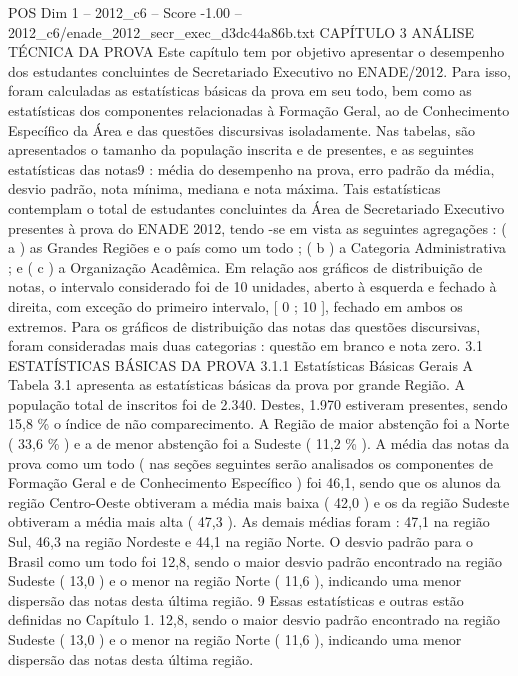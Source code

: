 \begin{textsample}{POS Dim 1 – 2012\_c6 – Score -1.00 – 2012\_c6/enade\_2012\_secr\_exec\_d3dc44a86b.txt}  \label{ex:f1_pos_186}
CAPÍTULO 3 ANÁLISE TÉCNICA DA PROVA Este capítulo tem por objetivo apresentar o desempenho dos estudantes concluintes de Secretariado Executivo no ENADE/2012.
Para isso, foram calculadas as estatísticas básicas da prova em seu todo, bem como as estatísticas dos componentes relacionadas à Formação Geral, ao de Conhecimento Específico da Área e das questões discursivas isoladamente.
Nas tabelas, são apresentados o tamanho da população inscrita e de presentes, e as seguintes estatísticas das notas9 : média do desempenho na prova, erro padrão da média, desvio padrão, nota mínima, mediana e nota máxima.
Tais estatísticas contemplam o total de estudantes concluintes da Área de Secretariado Executivo presentes à prova do ENADE 2012, tendo -se em vista as seguintes agregações : ( a ) as Grandes Regiões e o país como um todo ; ( b ) a Categoria Administrativa ; e ( c ) a Organização Acadêmica.
Em relação aos gráficos de distribuição de notas, o intervalo considerado foi de 10 unidades, aberto à esquerda e fechado à direita, com exceção do primeiro intervalo, [ 0 ; 10 ], fechado em ambos os extremos.
Para os gráficos de distribuição das notas das questões discursivas, foram consideradas mais duas categorias : questão em branco e nota zero. 3.1 ESTATÍSTICAS BÁSICAS DA PROVA 3.1.1 Estatísticas Básicas Gerais A Tabela 3.1 apresenta as estatísticas básicas da prova por grande Região.
A população total de inscritos foi de 2.340.
Destes, 1.970 estiveram presentes, sendo 15,8 \% o índice de não comparecimento.
A Região de maior abstenção foi a Norte ( 33,6 \% ) e a de menor abstenção foi a Sudeste ( 11,2 \% ).
A média das notas da prova como um todo ( nas seções seguintes serão analisados os componentes de Formação Geral e de Conhecimento Específico ) foi 46,1, sendo que os alunos da região Centro-Oeste obtiveram a média mais baixa ( 42,0 ) e os da região Sudeste obtiveram a média mais alta ( 47,3 ).
As demais médias foram : 47,1 na região Sul, 46,3 na região Nordeste e 44,1 na região Norte.
O desvio padrão para o Brasil como um todo foi 12,8, sendo o maior desvio padrão encontrado na região Sudeste ( 13,0 ) e o menor na região Norte ( 11,6 ), indicando uma menor dispersão das notas desta última região. 9 Essas estatísticas e outras estão definidas no Capítulo 1. 12,8, sendo o maior desvio padrão encontrado na região Sudeste ( 13,0 ) e o menor na região Norte ( 11,6 ), indicando uma menor dispersão das notas desta última região.

\end{textsample}

